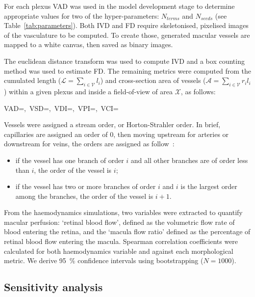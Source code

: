 \documentclass[11pt,]{article}
\let\oldequation\equation
\let\oldendequation\endequation
\renewenvironment{equation}
  {\linenomathNonumbers\oldequation}
  {\oldendequation\endlinenomath}
\begin{document}
For each plexus VAD was used in the model development stage to determine appropriate values for two of the hyper-parameters: $N_{terms}$ and $N_{seeds}$ (see Table~\ref{tab:parameters}).
Both IVD and FD require skeletonised, pixelised images of the vasculature to be computed.
To create those, generated macular vessels are mapped to a white canvas, then saved as binary images.

The euclidean distance transform was used to compute IVD and a box counting method was used to estimate FD. The remaining metrics were computed from the cumulated length ($\mathcal L=\sum_{i\in\mathcal V} l_i$) and cross-section area of vessels ($\mathcal A=\sum_{i\in\mathcal V} r_il_i$) within a given plexus and inside a field-of-view of area $\mathcal X$,  as follows:

\begin{equation}\label{eq:OCTAmetrics}
VAD=,\ VSD=,\ VDI=,\ VPI=,\ VCI=
\end{equation}

Vessels were assigned a stream order, or Horton-Strahler order.
In brief, capillaries are assigned an order of 0, then moving upstream for arteries or downstream for veins, the orders are assigned as follow~\cite{An2020}:
\begin{itemize}
\item if the vessel has one branch of order $i$ and all other branches are of order less than $i$, the order of the vessel is $i$;
\item if the vessel has two or more branches of order $i$ and $i$ is the largest order among the branches, the order of the vessel is $i+1$.
\end{itemize}

From the haemodynamics simulations, two variables were extracted to quantify macular perfusion: `retinal blood flow', defined as the volumetric flow rate of blood entering the retina, and the `macula flow ratio' defined as the percentage of retinal blood flow entering the macula.
Spearman correlation coefficients were calculated for both haemodynamics variable and against each morphological metric.
We derive \SI{95}{\percent} confidence intervals using bootstrapping ($N=1000$).

\subsection{Sensitivity analysis}\label{sec:method-gsa}
\end{document}
